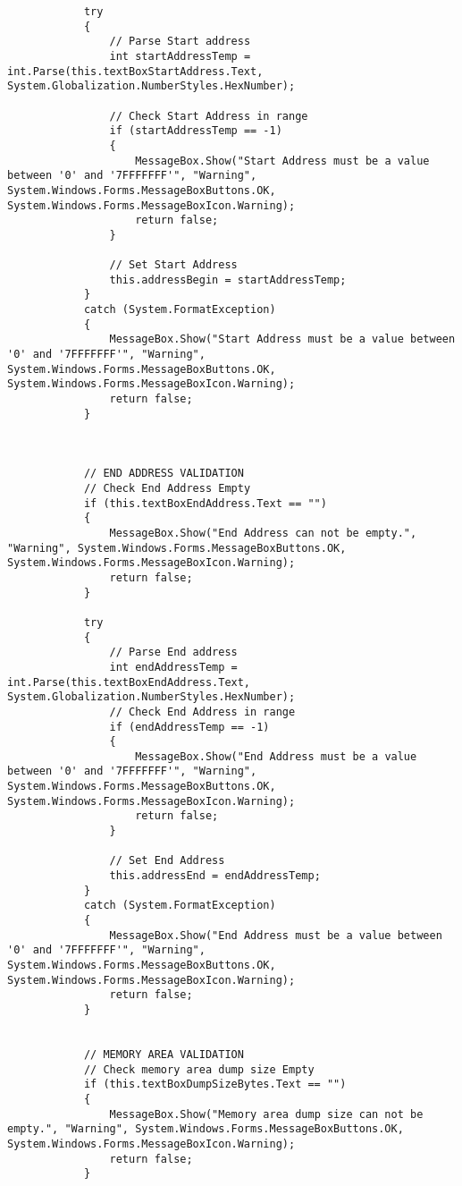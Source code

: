 \begin{lstlisting}
            try
            {
                // Parse Start address
                int startAddressTemp = int.Parse(this.textBoxStartAddress.Text, System.Globalization.NumberStyles.HexNumber);

                // Check Start Address in range
                if (startAddressTemp == -1)
                {
                    MessageBox.Show("Start Address must be a value between '0' and '7FFFFFFF'", "Warning", System.Windows.Forms.MessageBoxButtons.OK, System.Windows.Forms.MessageBoxIcon.Warning);
                    return false;
                }

                // Set Start Address
                this.addressBegin = startAddressTemp;
            }
            catch (System.FormatException)
            {
                MessageBox.Show("Start Address must be a value between '0' and '7FFFFFFF'", "Warning", System.Windows.Forms.MessageBoxButtons.OK, System.Windows.Forms.MessageBoxIcon.Warning);
                return false;
            }



            // END ADDRESS VALIDATION
            // Check End Address Empty
            if (this.textBoxEndAddress.Text == "")
            {
                MessageBox.Show("End Address can not be empty.", "Warning", System.Windows.Forms.MessageBoxButtons.OK, System.Windows.Forms.MessageBoxIcon.Warning);
                return false;
            }

            try
            {
                // Parse End address
                int endAddressTemp = int.Parse(this.textBoxEndAddress.Text, System.Globalization.NumberStyles.HexNumber);
                // Check End Address in range
                if (endAddressTemp == -1)
                {
                    MessageBox.Show("End Address must be a value between '0' and '7FFFFFFF'", "Warning", System.Windows.Forms.MessageBoxButtons.OK, System.Windows.Forms.MessageBoxIcon.Warning);
                    return false;
                }

                // Set End Address
                this.addressEnd = endAddressTemp;
            }
            catch (System.FormatException)
            {
                MessageBox.Show("End Address must be a value between '0' and '7FFFFFFF'", "Warning", System.Windows.Forms.MessageBoxButtons.OK, System.Windows.Forms.MessageBoxIcon.Warning);
                return false;
            }


            // MEMORY AREA VALIDATION
            // Check memory area dump size Empty
            if (this.textBoxDumpSizeBytes.Text == "")
            {
                MessageBox.Show("Memory area dump size can not be empty.", "Warning", System.Windows.Forms.MessageBoxButtons.OK, System.Windows.Forms.MessageBoxIcon.Warning);
                return false;
            }


\end{lstlisting}
